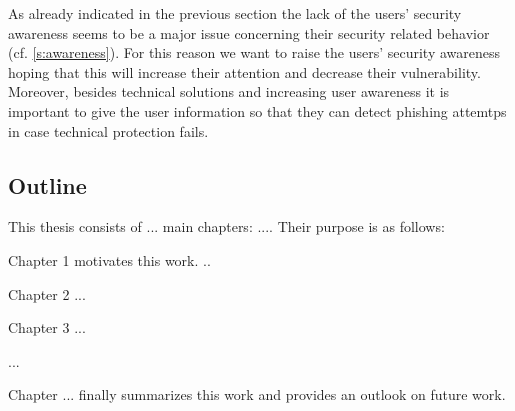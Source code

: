 As already indicated in the previous section the lack of the users' security awareness seems to be a major issue concerning their security related behavior (cf. \autoref{s:awareness}).
 For this reason we want to raise the users' security awareness hoping that this will increase their attention and decrease their vulnerability.
 Moreover, besides technical solutions and increasing user awareness it is important to give the user information so that they can detect phishing attemtps in case technical protection fails.

\subsection{Outline}


This thesis consists of ... main chapters: .... Their purpose is as follows:

Chapter 1 motivates this work.
..

Chapter 2 ...

Chapter 3 ...

...

Chapter ... finally summarizes this work and provides an outlook on future work.






